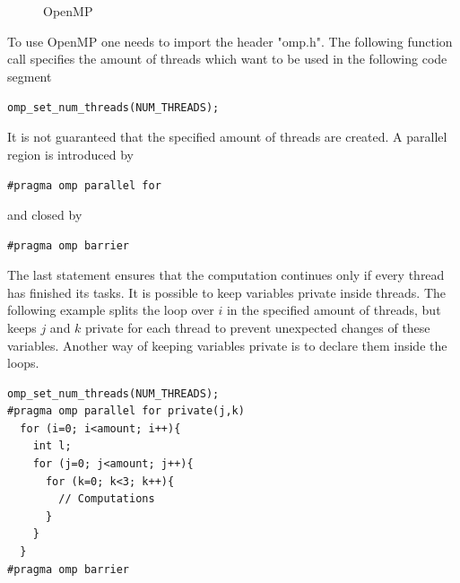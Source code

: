 \documentclass[a4paper]{article}
\begin{document}
\begin{figure}[H]
\centering
{}
\label{im:openmp}
\caption{OpenMP}
\end{figure}

To use OpenMP one needs to import the header "omp.h". The following function call specifies the amount of threads which want to be used in the following code segment

\begin{center}
\texttt{omp\_set\_num\_threads(NUM\_THREADS);}
\end{center}

It is not guaranteed that the specified amount of threads are created. A parallel region is introduced by

\begin{center}
\texttt{\#pragma omp parallel for}
\end{center}

and closed by

\begin{center}
\texttt{\#pragma omp barrier}
\end{center}

The last statement ensures that the computation continues only if every thread has finished its tasks. It is possible to keep variables private inside threads. The following example splits the loop over $i$ in the specified amount of threads, but keeps $j$ and $k$ private for each thread to prevent unexpected changes of these variables. Another way of keeping variables private is to declare them inside the loops.

\begin{lstlisting}[caption={Example: OpenMP}, label={c:openmp}]
omp_set_num_threads(NUM_THREADS);
#pragma omp parallel for private(j,k)
  for (i=0; i<amount; i++){
    int l;
    for (j=0; j<amount; j++){
      for (k=0; k<3; k++){
        // Computations
      }
    }
  }
#pragma omp barrier
\end{lstlisting}
\end{document}

